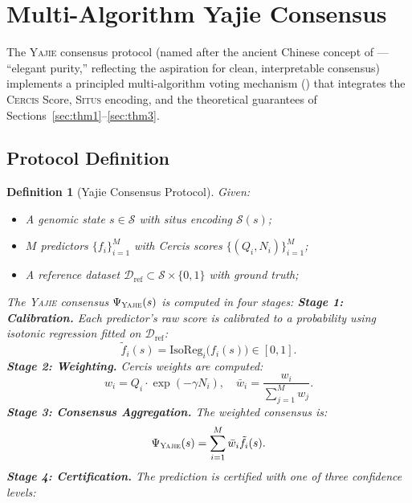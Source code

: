 \documentclass[11pt,a4paper]{article}
\newtheorem{definition}[theorem]{Definition}
\theoremstyle{definition}
\newcommand{\calD}{\mathcal{D}}
\newcommand{\calS}{\mathcal{S}}
\newcommand{\situs}{\textsc{Situs}}
\newcommand{\cercis}{\textsc{Cercis}}
\newcommand{\yajie}{\textsc{Yajie}}
\newcommand{\consensus}{\Psi}
\newcommand{\situsenc}{\mathcal{S}}
\newcommand{\multiconsensus}{}
\begin{document}
\section{Multi-Algorithm Yajie Consensus}
\label{sec:yajie}
The \yajie{} consensus protocol (named after the ancient Chinese concept of  — ``elegant purity,'' reflecting the aspiration for clean, interpretable consensus) implements a principled multi-algorithm voting mechanism (\multiconsensus{}) that integrates the \cercis{} Score, \situs{} encoding, and the theoretical guarantees of Sections~\ref{sec:thm1}--\ref{sec:thm3}.
\subsection{Protocol Definition}
\begin{definition}[Yajie Consensus Protocol]
Given:
\begin{itemize}[leftmargin=*]
    \item A genomic state $s \in \calS$ with situs encoding $\situsenc(s)$;
    \item $M$ predictors $\{f_i\}_{i=1}^{M}$ with Cercis scores $\{(Q_i, N_i)\}_{i=1}^{M}$;
    \item A reference dataset $\calD_{\text{ref}} \subset \calS \times \{0,1\}$ with ground truth;
\end{itemize}
The \yajie{} consensus $\consensus_{\yajie}(s)$ is computed in four stages:
\medskip\noindent\textbf{Stage 1: Calibration.}
Each predictor's raw score is calibrated to a probability using isotonic regression fitted on $\calD_{\text{ref}}$:
\begin{equation}
    \tilde{f}_i(s) = \text{IsoReg}_i\big(f_i(s)\big) \in [0,1].
\end{equation}
\medskip\noindent\textbf{Stage 2: Weighting.}
Cercis weights are computed:
\begin{equation}
    w_i = Q_i \cdot \exp(-\gamma N_i), \quad \bar{w}_i = \frac{w_i}{\sum_{j=1}^{M} w_j}.
\end{equation}
\medskip\noindent\textbf{Stage 3: Consensus Aggregation.}
The weighted consensus is:
\begin{equation}
    \consensus_{\yajie}(s) = \sum_{i=1}^{M} \bar{w}_i \tilde{f}_i(s).
\end{equation}
\medskip\noindent\textbf{Stage 4: Certification.}
The prediction is certified with one of three confidence levels:
\begin{itemize}[leftmargin=*]

\end{itemize}
\end{definition}
\end{document}
